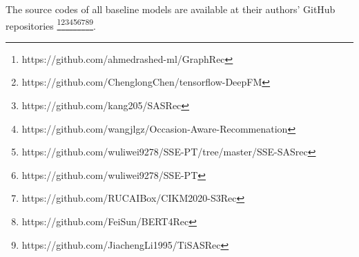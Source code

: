 \documentclass[sigconf,natbib=true]{acmart}
\begin{document}
The source codes of all baseline models are available at their authors' GitHub repositories  \footnote{https://github.com/ahmedrashed-ml/GraphRec}\footnote{https://github.com/ChenglongChen/tensorflow-DeepFM}\footnote{https://github.com/kang205/SASRec}\footnote{https://github.com/wangjlgz/Occasion-Aware-Recommenation}\footnote{https://github.com/wuliwei9278/SSE-PT/tree/master/SSE-SASrec}\footnote{https://github.com/wuliwei9278/SSE-PT}\footnote{https://github.com/RUCAIBox/CIKM2020-S3Rec}\footnote{https://github.com/FeiSun/BERT4Rec}\footnote{https://github.com/JiachengLi1995/TiSASRec}.



\end{document}

